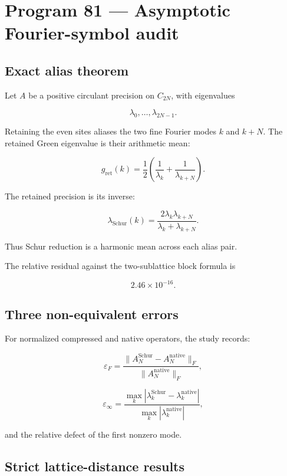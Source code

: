 \documentclass[11pt,a4paper,openany]{report}
\begin{document}
\chapter{Program 81 --- Asymptotic Fourier-symbol audit}

\section{Exact alias theorem}

Let \(A\) be a positive circulant precision on \(C_{2N}\), with eigenvalues

\[
\lambda_0,\ldots,\lambda_{2N-1}.
\]

Retaining the even sites aliases the two fine Fourier modes \(k\) and \(k+N\). The retained Green eigenvalue is their arithmetic mean:

\[
g_{\mathrm{ret}}(k)
=
\frac12
\left(
\frac1{\lambda_k}
+
\frac1{\lambda_{k+N}}
\right).
\]

The retained precision is its inverse:

\[
\lambda_{\mathrm{Schur}}(k)
=
\frac{2\lambda_k\lambda_{k+N}}
{\lambda_k+\lambda_{k+N}}.
\]

Thus Schur reduction is a harmonic mean across each alias pair.

The relative residual against the two-sublattice block formula is

\[
2.46\times10^{-16}.
\]

\section{Three non-equivalent errors}

For normalized compressed and native operators, the study records:

\[
\varepsilon_F
=
\frac{\|A^{\mathrm{Schur}}_N-A^{\mathrm{native}}_N\|_F}
{\|A^{\mathrm{native}}_N\|_F},
\]

\[
\varepsilon_\infty
=
\frac{\max_k|\lambda^{\mathrm{Schur}}_k-\lambda^{\mathrm{native}}_k|}
{\max_k|\lambda^{\mathrm{native}}_k|},
\]

and the relative defect of the first nonzero mode.

\section{Strict lattice-distance results}
\end{document}
